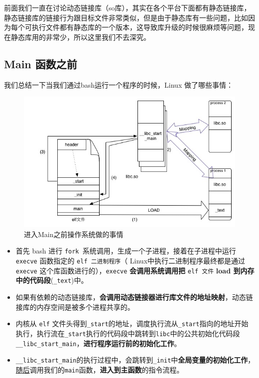 \documentclass[UTF8,a4paper,12pt]{ctexbook}
\begin{document}
			前面我们一直在讨论动态链接库（so库），其实在各个平台下面都有静态链接库，静态链接库的链接行为跟目标文件非常类似，但是由于静态库有一些问题，比如因为每个可执行文件都有静态库的一个版本，这导致库升级的时候很麻烦等问题，现在静态库用的非常少，所以这里我们不去深究。
			
		\subsection{Main 函数之前}
			我们总结一下当我们通过bash运行一个程序的时候，Linux 做了哪些事情：
				
			\begin{figure}[htbp]
				\includegraphics[scale = 0.7]{beforeMain.jpg}
				\caption{进入Main之前操作系统做的事情}
			\end{figure}
			
			\begin{itemize}[itemindent = 1em]
				\item 首先 bash 进行 \verb|fork |系统调用，生成一个子进程，接着在子进程中运行 \verb|execve| 函数指定的 \verb|elf 二进制程序|（ Linux中执行二进制程序最终都是通过 \verb|execve| 这个库函数进行的），\verb|execve| \textbf{会调用系统调用把} \verb|elf 文件| \textbf{load 到内存中的代码段}(\verb|_text|)中。
				
				\item 如果有依赖的动态链接库，\textbf{会调用动态链接器进行库文件的地址映射}，动态链接库的内存空间是被多个进程共享的。
				
				\item 内核从 \verb|elf| 文件头得到\verb|_start|的地址，调度执行流从\verb|_start|指向的地址开始执行，执行流在\verb|_start|执行的代码段中跳转到\verb|libc|中的公共初始化代码段\verb|__libc_start_main|，\textbf{进行程序运行前的初始化工作}。
				
				\item \verb|__libc_start_main|的执行过程中，会跳转到\verb|_init|中\textbf{全局变量的初始化工作}，\underline{随后}调用我们的\verb|main|函数，\textbf{进入到主函数}的指令流程。
			\end{itemize}
\end{document}
